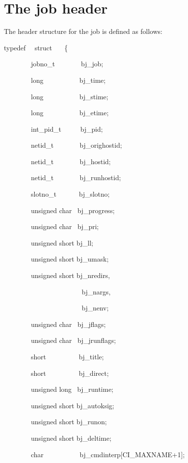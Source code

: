 \section{The job header}
The header structure for the job is defined as follows:

\begin{expara}

typedef \ \ struct \ \ \ \{

\ \ \ \ \ \ \ \ jobno\_t \ \ \ \ \ \ \ bj\_job;

\ \ \ \ \ \ \ \ long \ \ \ \ \ \ \ \ \ \ bj\_time;

\ \ \ \ \ \ \ \ long \ \ \ \ \ \ \ \ \ \ bj\_stime;

\ \ \ \ \ \ \ \ long \ \ \ \ \ \ \ \ \ \ bj\_etime;

\ \ \ \ \ \ \ \ int\_pid\_t \ \ \ \ \ bj\_pid;

\ \ \ \ \ \ \ \ netid\_t \ \ \ \ \ \ \ bj\_orighostid;

\ \ \ \ \ \ \ \ netid\_t \ \ \ \ \ \ \ bj\_hostid;

\ \ \ \ \ \ \ \ netid\_t \ \ \ \ \ \ \ bj\_runhostid;

\ \ \ \ \ \ \ \ slotno\_t \ \ \ \ \ \ bj\_slotno;

\ \ \ \ \ \ \ \ unsigned char \ bj\_progress;

\ \ \ \ \ \ \ \ unsigned char \ bj\_pri;

\ \ \ \ \ \ \ \ unsigned short bj\_ll;

\ \ \ \ \ \ \ \ unsigned short bj\_umask;

\ \ \ \ \ \ \ \ unsigned short bj\_nredirs,

\ \ \ \ \ \ \ \ \ \ \ \ \ \ \ \ \ \ \ \ \ \ \ bj\_nargs,

\ \ \ \ \ \ \ \ \ \ \ \ \ \ \ \ \ \ \ \ \ \ \ bj\_nenv;

\ \ \ \ \ \ \ \ unsigned char \ bj\_jflags;

\ \ \ \ \ \ \ \ unsigned char \ bj\_jrunflags;

\ \ \ \ \ \ \ \ short \ \ \ \ \ \ \ \ \ bj\_title;

\ \ \ \ \ \ \ \ short \ \ \ \ \ \ \ \ \ bj\_direct;

\ \ \ \ \ \ \ \ unsigned long \ bj\_runtime;

\ \ \ \ \ \ \ \ unsigned short bj\_autoksig;

\ \ \ \ \ \ \ \ unsigned short bj\_runon;

\ \ \ \ \ \ \ \ unsigned short bj\_deltime;

\ \ \ \ \ \ \ \ char \ \ \ \ \ \ \ \ \ \ bj\_cmdinterp[CI\_MAXNAME+1];


\end{expara}

